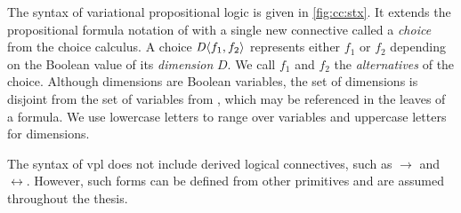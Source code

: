 %
The syntax of variational propositional logic is given in
\autoref{fig:cc:stx}. It extends the propositional formula notation of \pl{}
with a single new connective called a \emph{choice} from the choice calculus.
%
A choice $\chc[D]{f_1,f_2}$ represents either $f_1$ or $f_2$ depending on the
Boolean value of its \emph{dimension} $D$. We call $f_1$ and $f_2$ the
\emph{alternatives} of the choice.
%
Although dimensions are Boolean variables, the set of dimensions is disjoint
from the set of variables from \pl{}, which may be referenced in the leaves of
a formula. We use lowercase letters to range over variables and uppercase
letters for dimensions.

The syntax of \ac{vpl} does not include derived logical connectives, such as
$\rightarrow$ and $\leftrightarrow$. However, such forms can be defined
from other primitives and are assumed throughout the thesis.


